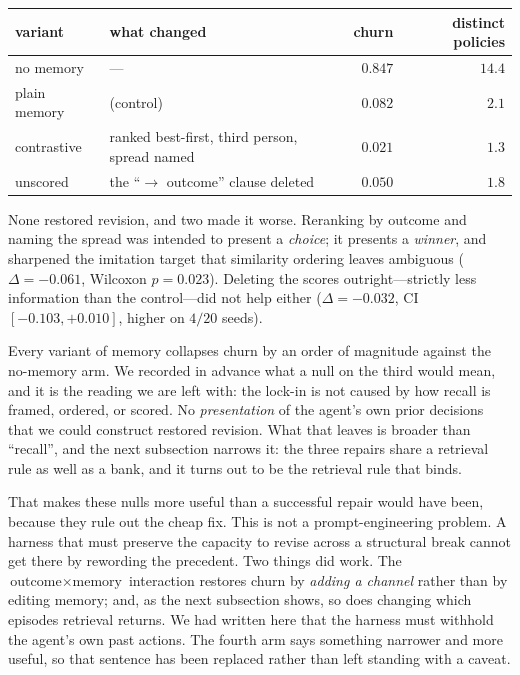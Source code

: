 \documentclass[11pt]{article}
\begin{document}
\begin{center}\small
\begin{tabular}{@{}llrr@{}}
\toprule
variant & what changed & churn & distinct policies \\
\midrule
no memory & --- & $\mathbf{0.847}$ & $14.4$ \\
plain memory & (control) & $0.082$ & $2.1$ \\
contrastive & ranked best-first, third person, spread named & $\mathbf{0.021}$ & $1.3$ \\
unscored & the ``$\to$ outcome'' clause deleted & $\mathbf{0.050}$ & $1.8$ \\
\bottomrule
\end{tabular}
\end{center}

None restored revision, and two made it worse. Reranking by outcome and naming the spread was
intended to present a \emph{choice}; it presents a \emph{winner}, and sharpened the imitation target
that similarity ordering leaves ambiguous ($\Delta = -0.061$, Wilcoxon $p=0.023$). Deleting the scores
outright---strictly less information than the control---did not help either
($\Delta = -0.032$, CI $[-0.103, +0.010]$, higher on $4/20$ seeds).

Every variant of memory collapses churn by an order of magnitude against the no-memory arm. We
recorded in advance what a null on the third would mean, and it is the reading we are left with: the
lock-in is not caused by how recall is framed, ordered, or scored. No \emph{presentation} of the
agent's own prior decisions that we could construct restored revision. What that leaves is broader
than ``recall'', and the next subsection narrows it: the three repairs share a retrieval rule as well
as a bank, and it turns out to be the retrieval rule that binds.

That makes these nulls more useful than a successful repair would have been, because they rule out
the cheap fix. This is not a prompt-engineering problem. A harness that must preserve the capacity to
revise across a structural break cannot get there by rewording the precedent. Two things did work.
The $\text{outcome} \times \text{memory}$ interaction restores churn by \emph{adding a channel}
rather than by editing memory; and, as the next subsection shows, so does changing which episodes
retrieval returns. We had written here that the harness must withhold the agent's own past actions.
The fourth arm says something narrower and more useful, so that sentence has been replaced rather
than left standing with a caveat.
\end{document}
